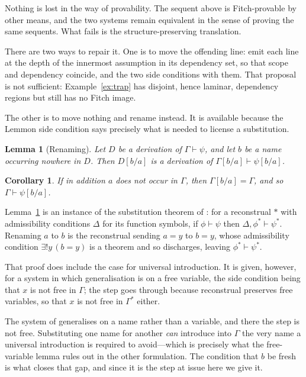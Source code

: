 \documentclass[11pt]{article}
\theoremstyle{plain}
\newtheorem{corollary}[theorem]{Corollary}
\newtheorem{lemma}[theorem]{Lemma}
\theoremstyle{definition}
\theoremstyle{remark}
\begin{document}
Nothing is lost in the way of provability. The sequent above is Fitch-provable
by other means, and the two systems remain equivalent in the sense of proving
the same sequents. What fails is the structure-preserving translation.

There are two ways to repair it. One is to move the offending line: emit each
line at the depth of the innermost assumption in its dependency set, so that
scope and dependency coincide, and the two side conditions with them. That
proposal is not sufficient: Example~\ref{ex:trap} has disjoint, hence laminar,
dependency regions but still has no Fitch image.

The other is to move nothing and rename instead. It is available because the
Lemmon side condition says precisely what is needed to license a substitution.

\begin{lemma}[Renaming]\label{lem:rename}
Let $D$ be a derivation of $\Gamma \vdash \psi$, and let $b$ be a name
occurring nowhere in $D$. Then $D[b/a]$ is a derivation of
$\Gamma[b/a] \vdash \psi[b/a]$.
\end{lemma}

\begin{corollary}\label{cor:rename}
If in addition $a$ does not occur in $\Gamma$, then $\Gamma[b/a] = \Gamma$,
and so $\Gamma \vdash \psi[b/a]$.
\end{corollary}

Lemma~\ref{lem:rename} is an instance of the substitution theorem
of \cite[Thm.~4.5.14]{halvorson2019}: for a reconstrual $*$ with admissibility
conditions $\Delta$ for its function symbols, if $\phi \vdash \psi$ then
$\Delta, \phi^* \vdash \psi^*$. Renaming $a$ to $b$ is the reconstrual sending
$a = y$ to $b = y$, whose admissibility condition $\exists ! y\,(b = y)$ is a
theorem and so discharges, leaving $\phi^* \vdash \psi^*$.

That proof does include the case for universal introduction. It is given,
however, for a system in which generalisation is on a free variable, the side
condition being that $x$ is not free in $\Gamma$; the step goes through
because reconstrual preserves free variables, so that $x$ is not free in
$\Gamma^*$ either.

The system of \cite{halvorson2020} generalises on a name rather than a
variable, and there the step is not free. Substituting one name for another
\emph{can} introduce into $\Gamma$ the very name a universal introduction is
required to avoid---which is precisely what the free-variable lemma rules out
in the other formulation. The condition that $b$ be fresh is what closes that
gap, and since it is the step at issue here we give it.
\end{document}

